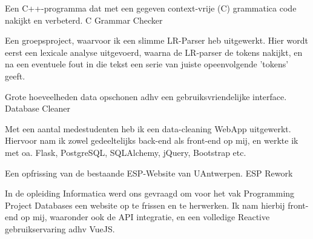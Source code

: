 
\begin{cventries}
  \cventry
    {Een C++-programma dat met een gegeven context-vrije (C) grammatica code nakijkt en verbeterd.} %
    {C Grammar Checker} %
    {} %
    {} %
    {
      \begin{cvitems} %
		\item {Een groepsproject, waarvoor ik een slimme LR-Parser heb uitgewerkt. Hier wordt eerst een lexicale analyse uitgevoerd, waarna de LR-parser de tokens nakijkt, en na een eventuele fout in die tekst een serie van juiste opeenvolgende 'tokens' geeft. }
      \end{cvitems}
    }

  \cventry
    {Grote hoeveelheden data opschonen adhv een gebruiksvriendelijke interface.} %
    {Database Cleaner} %
    {} %
    {} %
    {
      \begin{cvitems} %
      	\item {Met een aantal medestudenten heb ik een data-cleaning WebApp uitgewerkt. Hiervoor nam ik zowel gedeeltelijks back-end als front-end op mij, en werkte ik met oa. Flask, PostgreSQL, SQLAlchemy, jQuery, Bootstrap etc. }
      \end{cvitems}
    }
    
  \cventry
    {Een opfrissing van de bestaande ESP-Website van UAntwerpen.} %
    {ESP Rework} %
    {} %
    {} %
    {
      \begin{cvitems} %
      	\item {In de opleiding Informatica werd ons gevraagd om voor het vak Programming Project Databases een website op te frissen en te herwerken. Ik nam hierbij front-end op mij, waaronder ook de API integratie, en een volledige Reactive gebruikservaring adhv VueJS.}
      \end{cvitems}
    }
\end{cventries}